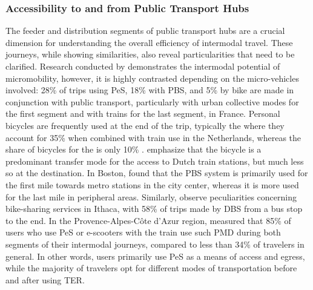 \begin{refsegment}
\subsubsection*{Accessibility to and from Public Transport Hubs
    \label{chap2:accessibility-first-last-km}
    }

The feeder and distribution segments of public transport hubs are a crucial dimension for understanding the overall efficiency of intermodal travel. These journeys, while showing similarities, also reveal particularities that need to be clarified. Research conducted by \textcolor{blue}{\textcite[62]{rabaud_quand_2022}} demonstrates the intermodal potential of micromobility, however, it is highly contrasted depending on the \gls{micro-vehicles} involved: 28\% of trips using \acrshort{PeS}, 18\% with \acrshort{PBS}, and 5\% by bike are made in conjunction with public transport, particularly with urban collective modes for the first segment and with trains for the last segment, in France. Personal bicycles are frequently used at the  end of the trip, typically the  where they account for 35\% when combined with train use in the Netherlands, whereas the share of bicycles for the  is only 10\% \textcolor{blue}{\autocite[74]{rietveld_accessibility_2000}}. \textcolor{blue}{\textcite[359]{givoni_access_2007}} emphasize that the bicycle is a predominant transfer mode for the access to Dutch train stations, but much less so at the destination. In Boston, \textcolor{blue}{\textcite[3]{romm_differences_2022}} found that the \acrshort{PBS} system is primarily used for the first mile towards metro stations in the city center, whereas it is more used for the last mile in peripheral areas. Similarly, \textcolor{blue}{\textcite[7]{qiu_interplay_2021}} observe peculiarities concerning bike-sharing services in Ithaca, with 58\% of trips made by \acrshort{DBS} from a bus stop to the  end. In the Provence-Alpes-Côte d'Azur region, \textcolor{blue}{\textcite[185]{moinse_intermodal_2022}} measured that 85\% of users who use \acrshort{PeS} or e-scooters with the train use such \acrfull{PMD} during both segments of their intermodal journeys, compared to less than 34\% of travelers in general. In other words, users primarily use \acrshort{PeS} as a means of access and egress, while the majority of travelers opt for different modes of transportation before and after using \acrshort{TER}.%


\end{refsegment}
